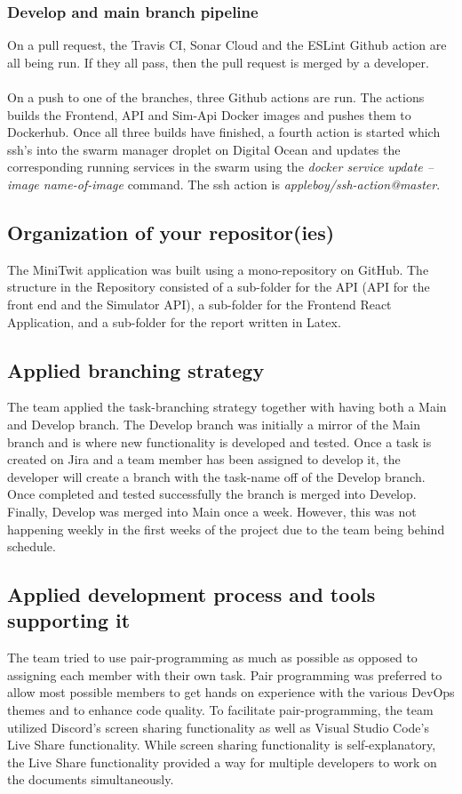 \subsubsection{Develop and main branch pipeline}
On a pull request, the Travis CI, Sonar Cloud and the ESLint Github action are all being run. If they all pass, then the pull request is merged by a developer.\\
\\
On a push to one of the branches, three Github actions are run. The actions builds the Frontend, API and Sim-Api Docker images and pushes them to Dockerhub. Once all three builds have finished, a fourth action is started which ssh's into the swarm manager droplet on Digital Ocean and updates the corresponding running services in the swarm using the \textit{docker service update --image name-of-image} command. The ssh action is \textit{appleboy/ssh-action@master}\cite{ssh-action}.


\subsection{Organization of your repositor(ies)}
The MiniTwit application was built using a mono-repository on GitHub. The structure in the Repository consisted of a sub-folder for the API (API for the front end and the Simulator API), a sub-folder for the Frontend React Application, and a sub-folder for the report written in Latex. 

\subsection{Applied branching strategy}
The team applied the task-branching strategy\cite{branching} together with having both a Main and Develop branch. The Develop branch was initially a mirror of the Main branch and is where new functionality is developed and tested. Once a task is created on Jira and a team member has been assigned to develop it, the developer will create a branch with the task-name off of the Develop branch. Once completed and tested successfully the branch is merged into Develop. Finally, Develop was merged into Main once a week. However, this was not happening weekly in the first weeks of the project due to the team being behind schedule. 

\subsection{Applied development process and tools supporting it}
The team tried to use pair-programming as much as possible as opposed to assigning each member with their own task. Pair programming was preferred to allow most possible members to get hands on experience with the various DevOps themes and to enhance code quality. To facilitate pair-programming, the team utilized Discord's screen sharing functionality as well as Visual Studio Code's Live Share functionality\cite{live_share}. While screen sharing functionality is self-explanatory, the Live Share functionality provided a way for multiple developers to work on the documents simultaneously. 


